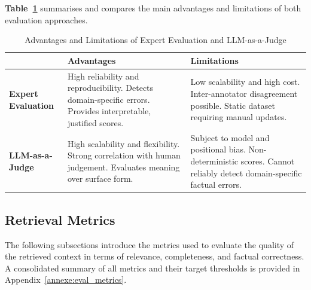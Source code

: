 \textbf{Table~\ref{tab:eval_comparison}} summarises and compares the main
advantages and limitations of both evaluation approaches.

\begin{table}[H]
\centering
\caption{Advantages and Limitations of Expert Evaluation and LLM-as-a-Judge}
\label{tab:eval_comparison}
\renewcommand{\arraystretch}{1.3}
\begin{tabular}{|p{3.5cm}|p{5.5cm}|p{5.5cm}|}
\hline
\textbf{} & \textbf{Advantages} & \textbf{Limitations} \\
\hline

\textbf{Expert Evaluation} &
High reliability and reproducibility. Detects domain-specific errors. Provides interpretable, justified scores. &
Low scalability and high cost. Inter-annotator disagreement possible. Static dataset requiring manual updates. \\
\hline

\textbf{LLM-as-a-Judge} &
High scalability and flexibility. Strong correlation with human judgement. Evaluates meaning over surface form. &
Subject to model and positional bias. Non-deterministic scores. Cannot reliably detect domain-specific factual errors. \\
\hline

\end{tabular}
\end{table}









\subsection{Retrieval Metrics}
The following subsections introduce the metrics used to evaluate the quality of the retrieved context in terms of relevance, completeness, and factual correctness. A consolidated summary of all metrics and their target thresholds
is provided in Appendix~\ref{annexe:eval_metrics}.

